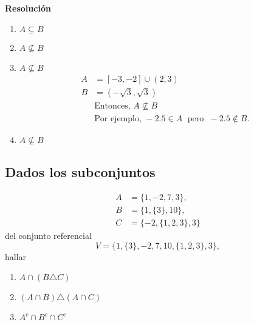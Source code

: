 \documentclass{article}
\begin{document}
\textbf{Resolución}
\begin{enumerate}[label=\roman*)]
    \item $A \subseteq B$
    \item $A \not\subseteq B$
    \item $A \not\subseteq B$
    \begin{align*}
        A &= [-3,-2] \cup (2,3) \\
        B &= (-\sqrt{3}, \sqrt{3}) \\[6pt]
        &\text{Entonces, } A \nsubseteq B \\
        &\text{Por ejemplo, } -2.5 \in A \;\text{ pero }\; -2.5 \notin B.
    \end{align*}
    \item $A \not\subseteq B$
\end{enumerate}

\subsection{Dados los subconjuntos}
\begin{align*}
A &= \{1,-2,7,3\}, \\
B &= \{1,\{3\},10\}, \\
C &= \{-2,\{1,2,3\},3\}
\end{align*}
del conjunto referencial
\[
V = \{1,\{3\},-2,7,10,\{1,2,3\},3\},
\]
hallar
\begin{enumerate}[label=\roman*)]
  \item $A \cap (B \triangle C)$
  \item $(A \cap B)\triangle (A \cap C)$
  \item $A^{c}\cap B^{c}\cap C^{c}$
\end{enumerate}
\end{document}
